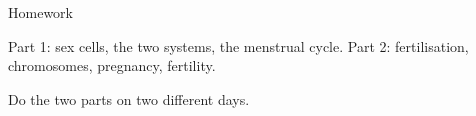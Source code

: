 \documentclass[aspectratio=169,11pt,xcolor=table]{beamer}
\begin{document}
\begin{frame}{Homework}
\relax
\vspace{2mm}
\par\vspace{3mm}
 Part 1: sex cells, the two systems, the menstrual cycle.
 Part 2: fertilisation, chromosomes, pregnancy, fertility.
\par\vspace{3mm}
Do the two parts on two different days.
\end{frame}
\end{document}
